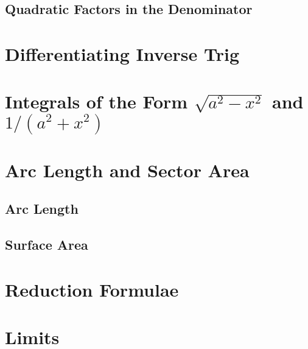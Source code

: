 \documentclass[../maths.tex]{subfiles}
\begin{document}
\subsection*{Quadratic Factors in the Denominator}
\section{Differentiating Inverse Trig}
\section{Integrals of the Form \texorpdfstring{$\sqrt{a^2-x^2}$}{sqrt(a squared -x squared)} and \texorpdfstring{$1/(a^2+x^2)$}{1/(a squared+x squared)}}
\section{Arc Length and Sector Area}
\subsection*{Arc Length}
\subsection*{Surface Area}
\section{Reduction Formulae}
\section{Limits}
\end{document}
